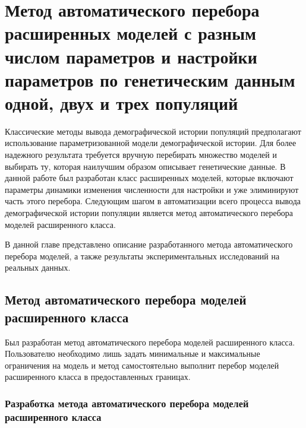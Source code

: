 \chapter{Метод автоматического перебора расширенных моделей с разным числом параметров и настройки параметров по генетическим данным одной, двух и трех популяций}
\label{ch:auto_model}

Классические методы вывода демографической истории популяций предполагают использование параметризованной модели демографической истории.
Для более надежного результата требуется вручную перебирать множество моделей и выбирать ту, которая наилучшим образом описывает генетические данные.
В данной работе был разработан класс расширенных моделей, которые включают параметры динамики изменения численности для настройки и уже элиминируют часть этого перебора.
Следующим шагом в автоматизации всего процесса вывода демографической истории популяции является метод автоматического перебора моделей расширенного класса.

В данной главе представлено описание разработанного метода автоматического перебора моделей, а также результаты экспериментальных исследований на реальных данных.

\section{Метод автоматического перебора моделей расширенного класса}

Был разработан метод автоматического перебора моделей расширенного класса.
Пользователю необходимо лишь задать минимальные и максимальные ограничения на модель и метод самостоятельно выполнит перебор моделей расширенного класса в предоставленных границах.

\subsection{Разработка метода автоматического перебора моделей расширенного класса}

